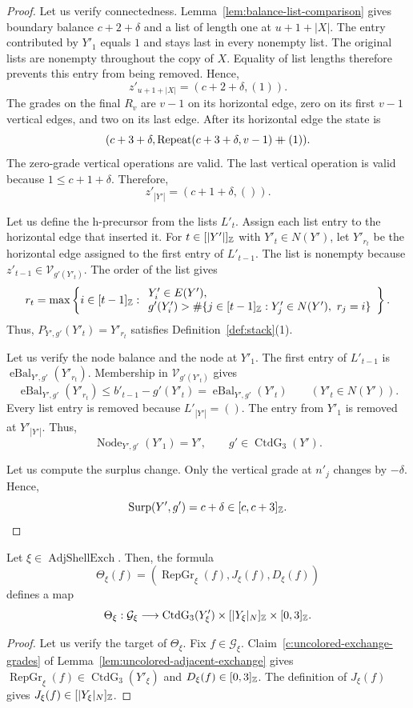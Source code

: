 \begin{proof}
Let us verify connectedness.
Lemma~\ref{lem:balance-list-comparison} gives boundary balance $c+2+\delta$ and a list of length one at $u+1+|X|$.
The entry contributed by $Y'_1$ equals $1$ and stays last in every nonempty list.
The original lists are nonempty throughout the copy of $X$.
Equality of list lengths therefore prevents this entry from being removed.
Hence,
\[
 z'_{u+1+|X|}=(c+2+\delta,(1)).
\]
The grades on the final $R_v$ are $v-1$ on its horizontal edge, zero on its first
$v-1$ vertical edges, and two on its last edge.
After its horizontal edge the state is
\[
 (c+3+\delta,\operatorname{Repeat}(c+3+\delta,v-1)\mathbin{+\mkern-10mu+}(1)).
\]
The zero-grade vertical operations are valid.
The last vertical operation is valid because $1\le c+1+\delta$.
Therefore,
\[
 z'_{|Y'|}=(c+1+\delta,()).
\]

Let us define the h-precursor from the lists $L'_t$.
Assign each list entry to the horizontal edge that inserted it.
For $t\in[|Y'|]_{\mathbb Z}$ with $Y'_t\in N(Y')$, let $Y'_{r_t}$ be the horizontal edge assigned to the first entry of $L'_{t-1}$.
The list is nonempty because $z'_{t-1}\in\mathcal V_{g'(Y'_t)}$.
The order of the list gives
\[
 r_t=\max\left\{i\in[t-1]_{\mathbb Z}:
 \begin{array}{l}
 Y'_i\in E(Y'),\\
 g'(Y'_i)>\#\{j\in[t-1]_{\mathbb Z}:Y'_j\in N(Y'),\ r_j=i\}
 \end{array}\right\}.
\]
Thus, $P_{Y',g'}(Y'_t)=Y'_{r_t}$ satisfies Definition~\ref{def:stack}(1).

Let us verify the node balance and the node at $Y'_1$.
The first entry of $L'_{t-1}$ is $\operatorname{eBal}_{Y',g'}(Y'_{r_t})$.
Membership in $\mathcal V_{g'(Y'_t)}$ gives
\[
 \operatorname{eBal}_{Y',g'}(Y'_{r_t})
 \le b'_{t-1}-g'(Y'_t)
 =\operatorname{eBal}_{Y',g'}(Y'_t)
 \qquad(Y'_t\in N(Y')).
\]
Every list entry is removed because $L'_{|Y'|}=()$.
The entry from $Y'_1$ is removed at $Y'_{|Y'|}$.
Thus,
\[
 \operatorname{Node}_{Y',g'}(Y'_1)=Y',\qquad g'\in\operatorname{CtdG}_3(Y').
\]

 Let us compute the surplus change.
Only the vertical grade at $n'_j$ changes by $-\delta$. Hence,
\[
 \operatorname{Surp}(Y',g')=c+\delta\in[c,c+3]_{\mathbb Z}.
\]
\end{proof}

\begin{corollary}\label{cor:adjacent-repair-map}
Let $\xi\in\operatorname{AdjShellExch}$.
Then, the formula
\[
 \Theta_\xi(f)=(\operatorname{RepGr}_\xi(f),J_\xi(f),D_\xi(f))
\]
defines a map
\[
 \Theta_\xi:\mathcal G_\xi\longrightarrow
 \operatorname{CtdG}_3(Y'_\xi)\times[|Y_\xi|_N]_{\mathbb Z}\times[0,3]_{\mathbb Z}.
\]
\end{corollary}
\begin{proof}
Let us verify the target of $\Theta_\xi$.
Fix $f\in\mathcal G_\xi$.
Claim~\ref{c:uncolored-exchange-grades} of Lemma~\ref{lem:uncolored-adjacent-exchange} gives
$\operatorname{RepGr}_\xi(f)\in\operatorname{CtdG}_3(Y'_\xi)$ and $D_\xi(f)\in[0,3]_{\mathbb Z}$.
The definition of $J_\xi(f)$ gives $J_\xi(f)\in[|Y_\xi|_N]_{\mathbb Z}$.
\end{proof}


